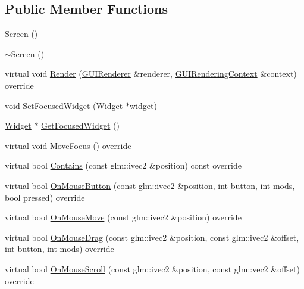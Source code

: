 \subsection*{Public Member Functions}
\begin{DoxyCompactItemize}
\item 
\mbox{\hyperlink{classngl__gui_1_1_screen_ad1d0d6b993208a4cf33f2c93821ab535}{Screen}} ()
\item 
\mbox{\hyperlink{classngl__gui_1_1_screen_a6ce1083856f0014ac80e3e0c1f01317c}{$\sim$\+Screen}} ()
\item 
virtual void \mbox{\hyperlink{classngl__gui_1_1_screen_ad020aeab5832bc6b4de6e4d6b73534da}{Render}} (\mbox{\hyperlink{classngl__gui_1_1_g_u_i_renderer}{G\+U\+I\+Renderer}} \&renderer, \mbox{\hyperlink{classngl__gui_1_1_g_u_i_rendering_context}{G\+U\+I\+Rendering\+Context}} \&context) override
\item 
void \mbox{\hyperlink{classngl__gui_1_1_screen_afbe7eb1318c16137632a0b2cb29bc704}{Set\+Focused\+Widget}} (\mbox{\hyperlink{classngl__gui_1_1_widget}{Widget}} $\ast$widget)
\item 
\mbox{\hyperlink{classngl__gui_1_1_widget}{Widget}} $\ast$ \mbox{\hyperlink{classngl__gui_1_1_screen_aa6f79b5960a4a60afa9b221c203207a5}{Get\+Focused\+Widget}} ()
\item 
virtual void \mbox{\hyperlink{classngl__gui_1_1_screen_a1a74a47ad88de9f75cc87c053eb7d00e}{Move\+Focus}} () override
\item 
virtual bool \mbox{\hyperlink{classngl__gui_1_1_screen_ac9e4f72e9a02a0df46f279076cfcef31}{Contains}} (const glm\+::ivec2 \&position) const override
\item 
virtual bool \mbox{\hyperlink{classngl__gui_1_1_screen_ad0caca6d76fd28cde657bdf2ee25f8dc}{On\+Mouse\+Button}} (const glm\+::ivec2 \&position, int button, int mods, bool pressed) override
\item 
virtual bool \mbox{\hyperlink{classngl__gui_1_1_screen_a2f56b25db5dbde69c8c80404a55aa2fd}{On\+Mouse\+Move}} (const glm\+::ivec2 \&position) override
\item 
virtual bool \mbox{\hyperlink{classngl__gui_1_1_screen_a532892ea85fdc456ef7d891a1a21694e}{On\+Mouse\+Drag}} (const glm\+::ivec2 \&position, const glm\+::ivec2 \&offset, int button, int mods) override
\item 
virtual bool \mbox{\hyperlink{classngl__gui_1_1_screen_a9aca448e61f50b24bfa2a5782424b910}{On\+Mouse\+Scroll}} (const glm\+::ivec2 \&position, const glm\+::vec2 \&offset) override
\item 

\end{DoxyCompactItemize}
